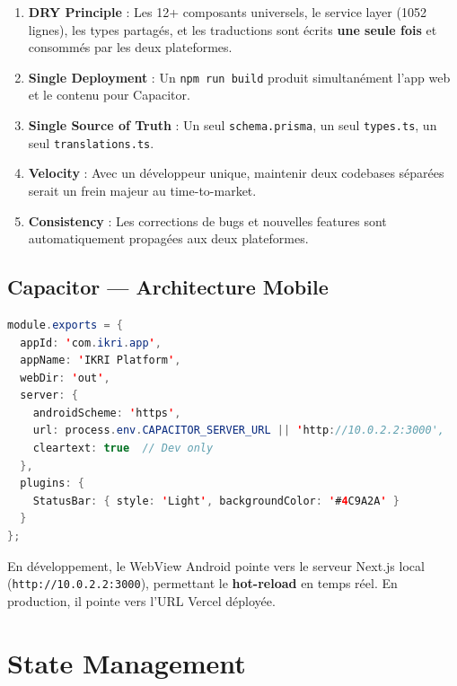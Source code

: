 \documentclass[12pt, a4paper]{article}
\begin{document}
\begin{infobox}
\begin{enumerate}
  \item \textbf{DRY Principle} : Les 12+ composants universels, le service layer (1052 lignes), les types partagés, et les traductions sont écrits \textbf{une seule fois} et consommés par les deux plateformes.
  \item \textbf{Single Deployment} : Un \texttt{npm run build} produit simultanément l'app web et le contenu pour Capacitor.
  \item \textbf{Single Source of Truth} : Un seul \texttt{schema.prisma}, un seul \texttt{types.ts}, un seul \texttt{translations.ts}.
  \item \textbf{Velocity} : Avec un développeur unique, maintenir deux codebases séparées serait un frein majeur au time-to-market.
  \item \textbf{Consistency} : Les corrections de bugs et nouvelles features sont automatiquement propagées aux deux plateformes.
\end{enumerate}
\end{infobox}

\subsection{Capacitor — Architecture Mobile}

\begin{lstlisting}[language=Java, caption=capacitor.config.js]
module.exports = {
  appId: 'com.ikri.app',
  appName: 'IKRI Platform',
  webDir: 'out',
  server: {
    androidScheme: 'https',
    url: process.env.CAPACITOR_SERVER_URL || 'http://10.0.2.2:3000',
    cleartext: true  // Dev only
  },
  plugins: {
    StatusBar: { style: 'Light', backgroundColor: '#4C9A2A' }
  }
};
\end{lstlisting}

En développement, le WebView Android pointe vers le serveur Next.js local (\texttt{http://10.0.2.2:3000}), permettant le \textbf{hot-reload} en temps réel. En production, il pointe vers l'URL Vercel déployée.

\section{State Management}
\end{document}
